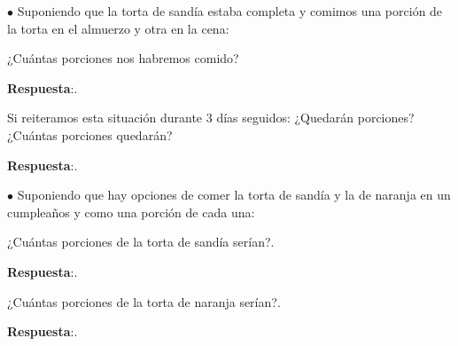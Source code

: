 \documentclass[11pt]{examdesign}
\begin{document}
    \begin{multicols}{2}
    	\begin{shortanswer}[title={Pensamos y reflexionamos (escribe en la carpeta tus conclusiones)},
    		,
    		rearrange=no,resetcounter=yes]
    		$\bullet$ Suponiendo que la torta de sandía estaba completa y comimos una porción de la torta en el almuerzo y otra en la cena: 
    		
    		\begin{question}
    			¿Cuántas porciones nos habremos comido?
    			\begin{answer}
    				\textbf{Respuesta}:.
    			\end{answer}
    		\end{question}
    		
    		\begin{question}
    			Si reiteramos esta situación durante 3 días seguidos: ¿Quedarán porciones? ¿Cuántas porciones quedarán?
    			\begin{answer}
    				\textbf{Respuesta}:.
    			\end{answer}
    		\end{question}
    	\end{shortanswer}
        \columnbreak
        \begin{shortanswer}[title={Pensamos y reflexionamos (escribe en la carpeta tus conclusiones)},
        	,
        	rearrange=no,resetcounter=yes]
        	
        	$\bullet$ Suponiendo que hay opciones de comer la torta de sandía y la de naranja en un cumpleaños y como una porción de cada una: 
        	
        	\begin{question}
        		¿Cuántas porciones de la torta de sandía serían?.
        		\begin{answer}
        			\textbf{Respuesta}:.
        		\end{answer}
        	\end{question}
        	
        	\begin{question}
        		¿Cuántas porciones de la torta de naranja serían?.
        		\begin{answer}
        			\textbf{Respuesta}:.
        		\end{answer}
        	\end{question}
        	
        \end{shortanswer}
    \end{multicols}
     
\end{document}
